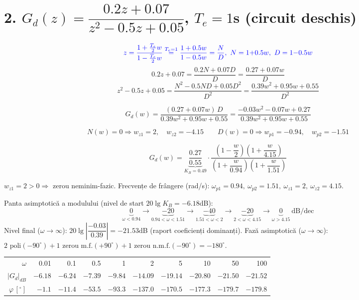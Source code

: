 \documentclass[10pt,a4paper]{article}
\begin{document}
\section*{2. $G_d(z)=\dfrac{0.2z+0.07}{z^2-0.5z+0.05}$, $T_e=1$s (circuit deschis)}
$$\color{blue}z=\frac{1+\frac{T_e}2w}{1-\frac{T_e}2w}\overset{T_e=1}{=}\frac{1+0.5w}{1-0.5w}=\frac ND,\ N=1{+}0.5w,\ D=1{-}0.5w$$
$$0.2z+0.07=\frac{0.2N+0.07D}D=\frac{0.27+0.07w}D$$
$$z^2-0.5z+0.05=\frac{N^2-0.5ND+0.05D^2}{D^2}=\frac{0.39w^2+0.95w+0.55}{D^2}$$
\begin{res}
$$G_d(w)=\frac{(0.27+0.07w)\,D}{0.39w^2+0.95w+0.55}=\frac{-0.03w^2-0.07w+0.27}{0.39w^2+0.95w+0.55}$$
\end{res}
$$N(w)=0\Rightarrow w_{z1}=2,\quad w_{z2}=-4.15\qquad D(w)=0\Rightarrow w_{p1}=-0.94,\quad w_{p2}=-1.51$$
\begin{res}
$$G_d(w)=\underbrace{\frac{0.27}{0.55}}_{K_B=0.49}\cdot\frac{\left(1-\dfrac w2\right)\left(1+\dfrac w{4.15}\right)}{\left(1+\dfrac w{0.94}\right)\left(1+\dfrac w{1.51}\right)}$$
\end{res}
$w_{z1}=2>0\Rightarrow$ zerou neminim-fazic.
Frecvențe de frângere (rad/s): $\omega_{p1}=0.94,\ \omega_{p2}=1.51,\ \omega_{z1}=2,\ \omega_{z2}=4.15$.
\begin{res}
Panta asimptotică a modulului (nivel de start $20\lg K_B=-6.18$dB):
$$\underbrace{0}_{\omega<0.94}\to\underbrace{-20}_{0.94<\omega<1.51}\to\underbrace{-40}_{1.51<\omega<2}\to\underbrace{-20}_{2<\omega<4.15}\to\underbrace{0}_{\omega>4.15}\ \text{dB/dec}$$
Nivel final ($\omega\to\infty$): $20\lg\left|\dfrac{-0.03}{0.39}\right|=-21.53$dB (raport coeficienți dominanți).
Fază asimptotică ($\omega\to\infty$): $2\text{ poli}(-90^\circ)+1\text{ zerou m.f.}(+90^\circ)+1\text{ zerou n.m.f.}(-90^\circ)=-180^\circ$.
\end{res}
\begin{res}
\begin{center}
\begin{tabular}{@{}rrrrrrrrrr@{}}
$\omega$&0.01&0.1&0.5&1&2&5&10&50&100\\
$|G_d|_{dB}$&$-6.18$&$-6.24$&$-7.39$&$-9.84$&$-14.09$&$-19.14$&$-20.80$&$-21.50$&$-21.52$\\
$\varphi\,[^\circ]$&$-1.1$&$-11.4$&$-53.5$&$-93.3$&$-137.0$&$-170.5$&$-177.3$&$-179.7$&$-179.8$\\
\end{tabular}
\end{center}
\end{res}
\end{document}
